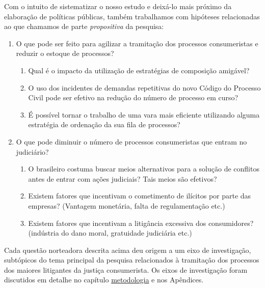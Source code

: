 \documentclass[]{report}
\providecommand{\tightlist}{%
  \setlength{\itemsep}{0pt}\setlength{\parskip}{0pt}}
\begin{document}
Com o intuito de sistematizar o nosso estudo e deixá-lo mais próximo da
elaboração de políticas públicas, também trabalhamos com hipóteses
relacionadas ao que chamamos de parte \emph{propositiva} da pesquisa:

\begin{enumerate}
\def\labelenumi{\arabic{enumi}.}
\tightlist
\item
  O que pode ser feito para agilizar a tramitação dos processos
  consumeristas e reduzir o estoque de processos?

  \begin{enumerate}
  \def\labelenumii{\arabic{enumii}.}
  \tightlist
  \item
    Qual é o impacto da utilização de estratégias de composição
    amigável?
  \item
    O uso dos incidentes de demandas repetitivas do novo Código do
    Processo Civil pode ser efetivo na redução do número de processo em
    curso?
  \item
    É possível tornar o trabalho de uma vara mais eficiente utilizando
    alguma estratégia de ordenação da sua fila de processos?
  \end{enumerate}
\item
  O que pode diminuir o número de processos consumeristas que entram no
  judiciário?

  \begin{enumerate}
  \def\labelenumii{\arabic{enumii}.}
  \tightlist
  \item
    O brasileiro costuma buscar meios alternativos para a solução de
    conflitos antes de entrar com ações judiciais? Tais meios são
    efetivos?
  \item
    Existem fatores que incentivam o cometimento de ilícitos por parte
    das empresas? (Vantagem monetária, falta de regulamentação etc.)
  \item
    Existem fatores que incentivam a litigância excessiva dos
    consumidores? (indústria do dano moral, gratuidade judiciária etc.)
  \end{enumerate}
\end{enumerate}

Cada questão norteadora descrita acima deu origem a um eixo de
investigação, subtópicos do tema principal da pesquisa relacionados à
tramitação dos processos dos maiores litigantes da justiça consumerista.
Os eixos de investigação foram discutidos em detalhe no capítulo 
\protect\hyperlink{metodologia}{metodologia} e nos Apêndices.
\end{document}
